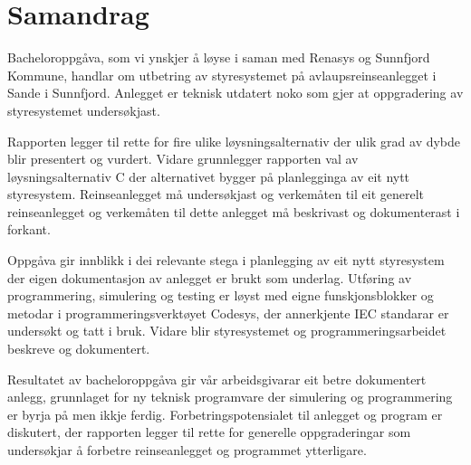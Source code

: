 \chapter{Samandrag}
\thispagestyle{romanpages}

Bacheloroppgåva, som vi ynskjer å løyse i saman med \gls{Renasys} og \gls{Sunnfjord Kommune}, handlar om utbetring av styresystemet på 
avlaupsreinseanlegget i Sande i Sunnfjord. 
Anlegget er teknisk utdatert noko som gjer at oppgradering av styresystemet undersøkjast.

Rapporten legger til rette for fire ulike løysningsalternativ
der ulik grad av dybde blir presentert og vurdert. \newline
Vidare grunnlegger rapporten val av løysningsalternativ C der alternativet bygger på planlegginga av eit nytt styresystem. 
Reinseanlegget må undersøkjast og 
verkemåten til eit generelt reinseanlegget og verkemåten til dette anlegget må beskrivast og dokumenterast i forkant.

Oppgåva gir innblikk i dei relevante stega i planlegging av eit nytt styresystem der eigen dokumentasjon av anlegget er brukt som underlag. 
Utføring av programmering, simulering og testing er løyst med eigne funskjonsblokker og metodar i programmeringsverktøyet \gls{Codesys},
der annerkjente \gls{IEC} standarar er undersøkt og tatt i bruk.
Vidare blir styresystemet og programmeringsarbeidet beskreve og dokumentert.

Resultatet av bacheloroppgåva gir vår arbeidsgivarar eit betre dokumentert anlegg, 
grunnlaget for ny teknisk programvare der simulering og programmering er byrja på men ikkje ferdig. \newline
Forbetringspotensialet til anlegget og program er diskutert, der rapporten legger til rette for generelle oppgraderingar
som undersøkjar å forbetre reinseanlegget og programmet ytterligare.